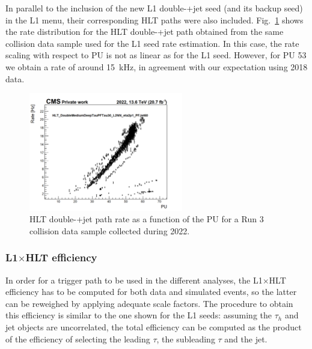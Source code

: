\documentclass[../main.tex]{subfiles}
\begin{document}
In parallel to the inclusion of the new L1 double-\tauh{}+jet seed (and its backup seed) in the L1 menu, their corresponding HLT paths were also included. Fig.~\ref{hh:fig:hlt_rate_run3} shows the rate distribution for the HLT double-\tauh{}+jet path obtained from the same collision data sample used for the L1 seed rate estimation. In this case, the rate scaling with respect to PU is not as linear as for the L1 seed. However, for PU 53 we obtain a rate of around 15~kHz, in agreement with our expectation using 2018 data.

\begin{figure}[h!]
\begin{center}
\includegraphics[width=0.6\textwidth]{Images/HLT_rate}
\end{center}
\caption{HLT double-\tauh{}+jet path rate as a function of the PU for a Run 3 collision data sample collected during 2022.}
\label{hh:fig:hlt_rate_run3}
\end{figure}

\subsubsection{L1$\times$HLT efficiency}

In order for a trigger path to be used in the different analyses, the L1$\times$HLT efficiency has to be computed for both data and simulated events, so the latter can be reweighed by applying adequate scale factors. The procedure to obtain this efficiency is similar to the one shown for the L1 seeds: assuming the $\tau_h$ and jet objects are uncorrelated, the total efficiency can be computed as the product of the efficiency of selecting the leading $\tau$, the subleading $\tau$ and the jet.
\end{document}
